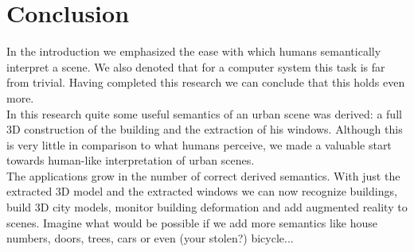 \section{Conclusion}
In the introduction we emphasized the ease with which humans semantically
interpret a scene.  We also denoted that for a computer system this task is far
from trivial. Having completed this research we can conclude that this holds even
more.\\

In this research quite some useful semantics of an urban scene was derived: a
full 3D construction of the building and the extraction of his windows.
Although this is very little in comparison to what humans perceive, we made a
valuable start towards human-like interpretation of urban scenes.\\

The applications grow in the number of correct derived semantics. With just the
extracted 3D model and the extracted windows we can now recognize buildings,
build 3D city models, monitor building deformation and add augmented reality
to scenes.  Imagine what would be possible if we add more semantics like
house numbers, doors, trees, cars or even (your stolen?) bicycle...
